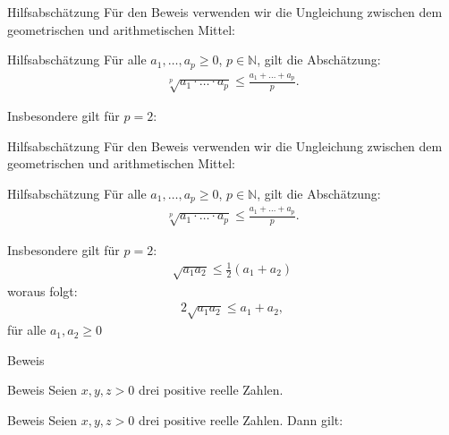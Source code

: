 \documentclass[10pt]{beamer}
\def\bN{\mathbb{N}}
\begin{document}
\begin{frame}{Hilfsabschätzung}
    Für den Beweis verwenden wir die Ungleichung zwischen dem geometrischen und arithmetischen Mittel:
    \begin{block}{Hilfsabschätzung}
        Für alle \( a_{1}, \ldots, a_{p} \geq 0 \), \( p \in \bN \), gilt die Abschätzung:
        \begin{align*}
            \sqrt[p]{a_{1} \cdot \ldots \cdot a_{p}} 
            \leq \frac{a_{1} + \ldots + a_{p}}{p}.
        \end{align*}
    \end{block}
    Insbesondere gilt für \( p = 2 \):   
\end{frame}



\begin{frame}{Hilfsabschätzung}
    Für den Beweis verwenden wir die Ungleichung zwischen dem geometrischen und arithmetischen Mittel:
    \begin{block}{Hilfsabschätzung}
        Für alle \( a_{1}, \ldots, a_{p} \geq 0 \), \( p \in \bN \), gilt die Abschätzung:
        \begin{align*}
            \sqrt[p]{a_{1} \cdot \ldots \cdot a_{p}} 
            \leq \frac{a_{1} + \ldots + a_{p}}{p}.
        \end{align*}
    \end{block}
    Insbesondere gilt für \( p = 2 \): 
    \begin{align*}
        \sqrt{a_{1} a_{2}}
        \leq \frac{1}{2} \left( a_{1} + a_{2} \right)
    \end{align*}
    woraus folgt:
    \begin{align*}
        2 \sqrt{a_{1} a_{2}}
        \leq a_{1} + a_{2}, 
    \end{align*}
    für alle \( a_{1}, a_{2} \geq 0 \)
\end{frame}



\begin{frame}{Beweis}
    
\end{frame}



\begin{frame}{Beweis}
    Seien \(x, y, z > 0\) drei positive reelle Zahlen.
\end{frame}



\begin{frame}{Beweis}
    Seien \(x, y, z > 0\) drei positive reelle Zahlen. Dann gilt:
\end{frame}
\end{document}
